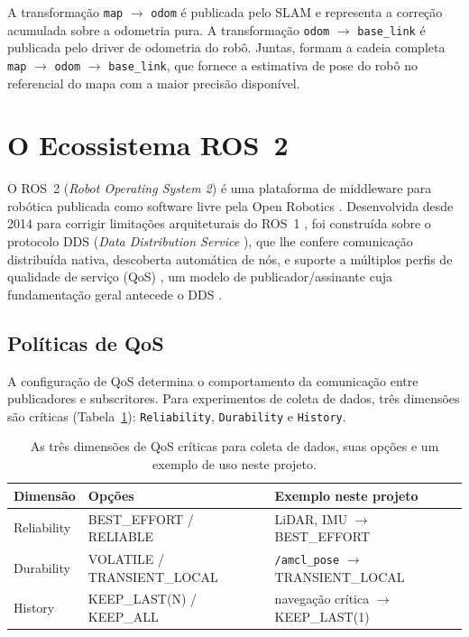A transformação \texttt{map} $\to$ \texttt{odom} é publicada pelo SLAM e
representa a correção acumulada sobre a odometria pura. A transformação
\texttt{odom} $\to$ \texttt{base\_\allowbreak link} é publicada pelo driver de odometria
do robô. Juntas, formam a cadeia completa \texttt{map} $\to$ \texttt{odom}
$\to$ \texttt{base\_\allowbreak link}, que fornece a estimativa de pose do robô no
referencial do mapa com a maior precisão disponível.

\section{O Ecossistema ROS~2}
\label{sec:ros2}

O ROS~2 (\textit{Robot Operating System 2}) é uma plataforma de middleware para
robótica publicada como software livre pela Open Robotics \cite{macenski2022ros2}.
Desenvolvida desde 2014 para corrigir limitações arquiteturais do
ROS~1 \cite{quigley2009}, foi
construída sobre o protocolo DDS (\textit{Data Distribution Service}
\cite{pardocastellote2003dds, macenski2022ros2}), que lhe
confere comunicação distribuída nativa, descoberta automática de nós, e suporte
a múltiplos perfis de qualidade de serviço (QoS) \cite{omgdds2015}, um modelo de
publicador/assinante cuja fundamentação geral antecede o DDS
\cite{eugster2003pubsub}.

\subsection{Políticas de QoS}
\label{sec:qos}

A configuração de QoS determina o comportamento da comunicação entre publicadores
e subscritores. Para experimentos de coleta de dados, três dimensões são críticas
(Tabela~\ref{tab:qos_dimensoes}): \texttt{Reliability}, \texttt{Durability} e
\texttt{History}.

\begin{table}[H]
\centering
\caption{As três dimensões de QoS críticas para coleta de dados, suas
opções e um exemplo de uso neste projeto.}
\label{tab:qos_dimensoes}
\begin{tabularx}{\textwidth}{llX}
\toprule
\textbf{Dimensão} & \textbf{Opções} & \textbf{Exemplo neste projeto} \\
\midrule
Reliability & BEST\_EFFORT / RELIABLE & LiDAR, IMU $\to$ BEST\_EFFORT \\
Durability  & VOLATILE / TRANSIENT\_LOCAL & \texttt{/amcl\_pose} $\to$ TRANSIENT\_LOCAL \\
History     & KEEP\_LAST(N) / KEEP\_ALL & navegação crítica $\to$ KEEP\_LAST(1) \\
\bottomrule
\end{tabularx}
\end{table}

